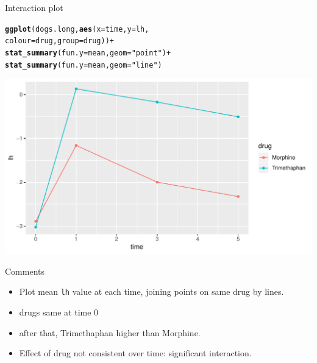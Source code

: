 \documentclass[unknownkeysallowed]{beamer}\usepackage[]{graphicx}\usepackage[]{color}
\makeatletter
\def\maxwidth{ %
  \ifdim\Gin@nat@width>\linewidth
    \linewidth
  \else
    \Gin@nat@width
  \fi
}
\newcommand{\hlstr}[1]{\textcolor[rgb]{0.192,0.494,0.8}{#1}}%
\newcommand{\hlopt}[1]{\textcolor[rgb]{0,0,0}{#1}}%
\newcommand{\hlstd}[1]{\textcolor[rgb]{0.345,0.345,0.345}{#1}}%
\newcommand{\hlkwc}[1]{\textcolor[rgb]{0.333,0.667,0.333}{#1}}%
\newcommand{\hlkwd}[1]{\textcolor[rgb]{0.737,0.353,0.396}{\textbf{#1}}}%
\newenvironment{kframe}{%
 \def\at@end@of@kframe{}%
 \ifinner\ifhmode%
  \def\at@end@of@kframe{\end{minipage}}%
  \begin{minipage}{\columnwidth}%
 \fi\fi%
 \def\FrameCommand##1{\hskip\@totalleftmargin \hskip-\fboxsep
 \colorbox{shadecolor}{##1}\hskip-\fboxsep
     \hskip-\linewidth \hskip-\@totalleftmargin \hskip\columnwidth}%
 \MakeFramed {\advance\hsize-\width
   \@totalleftmargin\z@ \linewidth\hsize
   \@setminipage}}%
 {\par\unskip\endMakeFramed%
 \at@end@of@kframe}
\newenvironment{knitrout}{}{} %
\makeatother
\begin{document}
\begin{frame}[fragile]{Interaction plot}
  
\begin{knitrout}\small
{}\color{fgcolor}\begin{kframe}
\begin{alltt}
\hlkwd{ggplot}\hlstd{(dogs.long,}\hlkwd{aes}\hlstd{(}\hlkwc{x}\hlstd{=time,}\hlkwc{y}\hlstd{=lh,}
                     \hlkwc{colour}\hlstd{=drug,}\hlkwc{group}\hlstd{=drug))}\hlopt{+}
  \hlkwd{stat_summary}\hlstd{(}\hlkwc{fun.y}\hlstd{=mean,}\hlkwc{geom}\hlstd{=}\hlstr{"point"}\hlstd{)}\hlopt{+}
  \hlkwd{stat_summary}\hlstd{(}\hlkwc{fun.y}\hlstd{=mean,}\hlkwc{geom}\hlstd{=}\hlstr{"line"}\hlstd{)}
\end{alltt}
\end{kframe}
\includegraphics[width=\maxwidth]{figure/unnamed-chunk-245-1} 

\end{knitrout}
  
\end{frame}


\begin{frame}[fragile]{Comments}
  

\begin{itemize}
\item Plot mean \texttt{lh} value at each time, joining points on same
  drug by lines.
\item drugs same at time 0
\item after that, Trimethaphan higher than Morphine.
\item Effect of drug not consistent over time: significant interaction.
\end{itemize}

\end{frame}
\end{document}
